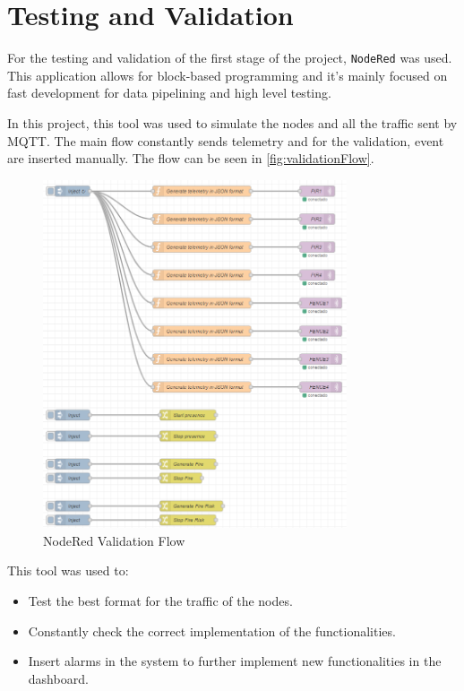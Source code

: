 \section{Testing and Validation}

For the testing and validation of the first stage of the project, \texttt{NodeRed}\cite{NodeRED} was used. This application 
allows for block-based programming and it's mainly focused on fast development for data pipelining and high level testing.

In this project, this tool was used to simulate the nodes and all the traffic sent by MQTT. The main flow constantly sends 
telemetry and for the validation, event are inserted manually. The flow can be seen in \autoref{fig:validationFlow}.
\begin{figure}[H]
    \centering
    \includegraphics[width=0.8\textwidth]{./images/9/NodeRed.png}
    \caption{NodeRed Validation Flow}
    \label{fig:validationFlow}
\end{figure}

This tool was used to:
\begin{itemize}
    \item Test the best format for the traffic of the nodes.
    \item Constantly check the correct implementation of the functionalities.
    \item Insert alarms in the system to further implement new functionalities in the dashboard.
\end{itemize}

